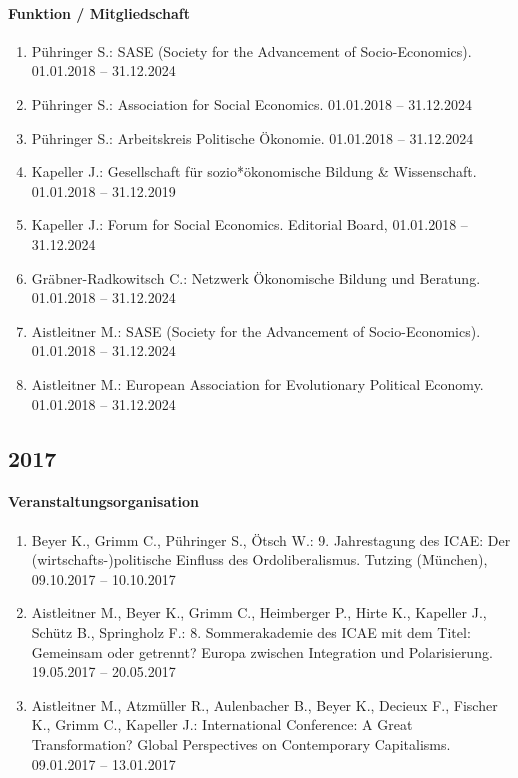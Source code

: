 \paragraph{Funktion / Mitgliedschaft}
\begin{enumerate}[leftmargin=*, labelsep=0.5cm]
\item Pühringer S.: SASE (Society for the Advancement of Socio-Economics). 01.01.2018 -- 31.12.2024
\item Pühringer S.: Association for Social Economics. 01.01.2018 -- 31.12.2024
\item Pühringer S.: Arbeitskreis Politische Ökonomie. 01.01.2018 -- 31.12.2024
\item Kapeller J.: Gesellschaft für sozio*ökonomische Bildung \& Wissenschaft. 01.01.2018 -- 31.12.2019
\item Kapeller J.: Forum for Social Economics. Editorial Board, 01.01.2018 -- 31.12.2024
\item Gräbner-Radkowitsch C.: Netzwerk Ökonomische Bildung und Beratung. 01.01.2018 -- 31.12.2024
\item Aistleitner M.: SASE (Society for the Advancement of Socio-Economics). 01.01.2018 -- 31.12.2024
\item Aistleitner M.: European Association for Evolutionary Political Economy. 01.01.2018 -- 31.12.2024
\end{enumerate}
\subsection*{2017}
\paragraph{Veranstaltungsorganisation}
\begin{enumerate}[leftmargin=*, labelsep=0.5cm]
\item Beyer K., Grimm C., Pühringer S., Ötsch W.: 9. Jahrestagung des ICAE: Der (wirtschafts-)politische Einfluss des Ordoliberalismus. Tutzing (München), 09.10.2017 -- 10.10.2017
\item Aistleitner M., Beyer K., Grimm C., Heimberger P., Hirte K., Kapeller J., Schütz B., Springholz F.: 8. Sommerakademie des ICAE mit dem Titel: Gemeinsam oder getrennt? Europa zwischen Integration und Polarisierung. 19.05.2017 -- 20.05.2017
\item Aistleitner M., Atzmüller R., Aulenbacher B., Beyer K., Decieux F., Fischer K., Grimm C., Kapeller J.: International Conference: A Great Transformation? Global Perspectives on Contemporary Capitalisms. 09.01.2017 -- 13.01.2017
\end{enumerate}

